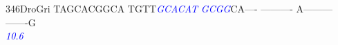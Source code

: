 \documentclass[11pt,twoside,reqno,a4paper]{article}
\begin{document}
{346\hspace*{1\charwidth}DroGri	TAGCACGGCA	TGTT\textit{\textcolor{blue}{G}}\textit{\textcolor{blue}{C}}\textit{\textcolor{blue}{A}}\textit{\textcolor{blue}{C}}\textit{\textcolor{blue}{A}}\textit{\textcolor{blue}{T}}	\textit{\textcolor{blue}{G}}\textit{\textcolor{blue}{C}}\textit{\textcolor{blue}{G}}\textit{\textcolor{blue}{G}}CA----	----------	A---------	-------G\\
\hspace*{4\charwidth}\hspace*{7\charwidth}\hspace*{1\charwidth}\hspace*{14\charwidth}\textit{\textcolor{blue}{10.6}}\hspace*{1\charwidth}\hspace*{1\charwidth}\hspace*{1\charwidth}\hspace*{1\charwidth}\\
\\
}
\end{document}
